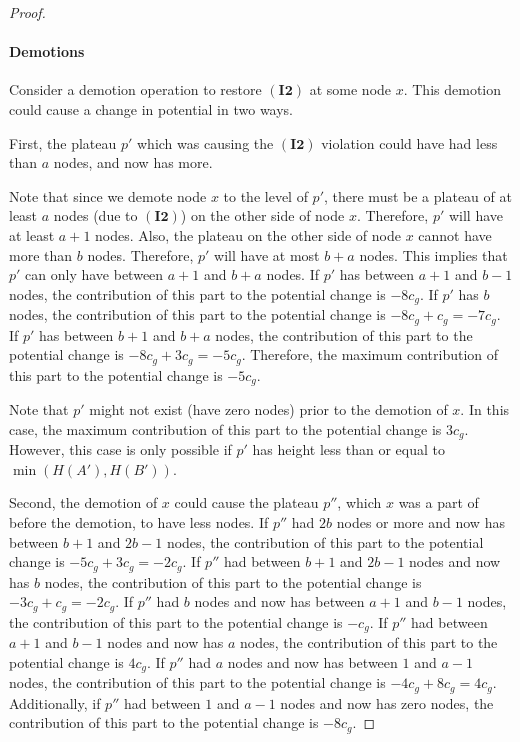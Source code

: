 \documentclass[11pt]{article}
\newcommand{\cons}[1]{\ensuremath{c_{#1}}}
\newcommand{\cnsg}{\cons g}
\newcommand{\invtwo}{\ensuremath{\mathbf{(I2)}}}
\newcommand{\intheight}[1]{\ensuremath{H(#1)}}
\newcommand{\beforeop}[1]{\ensuremath{#1'}}
\newcommand{\node}[1]{\ensuremath{#1}}
\begin{document}
\begin{proof}
\paragraph{Demotions} 
Consider a demotion operation to restore \invtwo{} at some node \node x. This demotion could cause a change in potential in two ways. 

First, the plateau $p'$ which was causing the \invtwo{} violation could have had less than $a$ nodes, and now has more. 

Note that since we demote node \node x to the level of $p'$, there must be a plateau of at least $a$ nodes (due to \invtwo{}) on the other side of node \node x. Therefore, $p'$ will have at least $a+1$ nodes. Also, the plateau on the other side of node \node x cannot have more than $b$ nodes. Therefore, $p'$ will have at most $b+a$ nodes. This implies that $p'$ can only  have between $a+1$ and $b+a$ nodes. 
If $p'$ has between $a+1$ and $b-1$ nodes, the contribution of this part to the potential change is $-8\cnsg$. 
If $p'$ has $b$ nodes, the contribution of this part to the potential change is $-8\cnsg + \cnsg = -7\cnsg$. 
If $p'$ has between $b+1$ and $b+a$ nodes, the contribution of this part to the potential change is $-8\cnsg + 3\cnsg = -5\cnsg$. 
Therefore, the maximum contribution of this part to the potential change is $-5\cnsg$. 


Note that $p'$ might not exist (have zero nodes) prior to the demotion of $x$. In this case, the maximum contribution of this part to the potential change is $3\cnsg$.  However, this case is only possible if $p'$ has height less than or equal to $\min(\intheight{\beforeop{A}},\intheight{\beforeop{B}})$. 


Second, the demotion of $x$ could cause the plateau $p''$, which $x$ was a part of before the demotion, to have less nodes. 
If $p''$ had $2b$ nodes or more and now has between $b+1$ and $2b-1$ nodes, the contribution of this part to the potential change is $-5\cnsg + 3\cnsg = -2\cnsg$. 
If $p''$ had between $b+1$ and $2b-1$ nodes and now has $b$ nodes, the contribution of this part to the potential change is $-3\cnsg + \cnsg = -2\cnsg$. 
If $p''$ had $b$ nodes and now has between $a+1$ and $b-1$ nodes, the contribution of this part to the potential change is $-\cnsg$. 
If $p''$ had between $a+1$ and $b-1$ nodes and now has $a$ nodes, the contribution of this part to the potential change is $4\cnsg$. 
If $p''$ had $a$ nodes and now has between $1$ and $a-1$ nodes, the contribution of this part to the potential change is $-4\cnsg + 8\cnsg = 4\cnsg$. 
Additionally, if $p''$ had between $1$ and $a-1$ nodes and now has zero nodes, the contribution of this part to the potential change is $-8\cnsg$. 


\end{proof}
\end{document}
